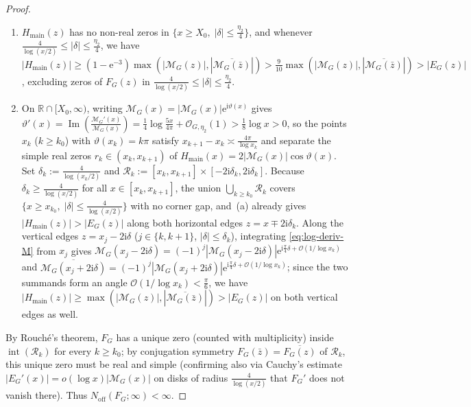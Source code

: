 \documentclass[11pt,a4paper,reqno]{amsart}
\theoremstyle{definition}
\theoremstyle{remark}
\numberwithin{equation}{section}
\newcommand{\R}{\mathbb{R}}
\newcommand{\ii}{\mathrm{i}}
\newcommand{\ee}{\mathrm{e}}
\DeclareMathOperator{\Imop}{Im}
\begin{document}
\begin{proof}
\begin{enumerate}[label=\textup{(\alph*)},leftmargin=1.8em]
  \item $H_{\mathrm{main}}(z)$ has no non-real zeros in $\{x \ge X_0,\; |\delta| \le \frac{\eta_2}{4}\}$, and whenever $\frac{4}{\log(x/2)} \le |\delta| \le \frac{\eta_2}{4}$, we have $|H_{\mathrm{main}}(z)| \ge (1 - \ee^{-3})\max(|\mathcal{M}_G(z)|, |\overline{\mathcal{M}_G(\bar{z})}|) > \frac{9}{10}\max(|\mathcal{M}_G(z)|, |\overline{\mathcal{M}_G(\bar{z})}|) > |E_G(z)|$, excluding zeros of $F_G(z)$ in $\frac{4}{\log(x/2)} \le |\delta| \le \frac{\eta_2}{4}$.
  \item On $\R \cap [X_0, \infty)$, writing $\mathcal{M}_G(x) = |\mathcal{M}_G(x)|\ee^{\ii\vartheta(x)}$ gives $\vartheta'(x) = \Imop(\frac{\mathcal{M}_G'(x)}{\mathcal{M}_G(x)}) = \frac{1}{4}\log\frac{5x}{4\pi} + \mathcal{O}_{G,\eta_2}(1) > \frac{1}{8}\log x > 0$, so the points $x_k$ ($k \ge k_0$) with $\vartheta(x_k) = k\pi$ satisfy $x_{k+1} - x_k \asymp \frac{4\pi}{\log x_k}$ and separate the simple real zeros $r_k \in (x_k, x_{k+1})$ of $H_{\mathrm{main}}(x) = 2|\mathcal{M}_G(x)|\cos\vartheta(x)$. Set $\delta_k := \frac{4}{\log(x_k/2)}$ and $\mathcal{R}_k := [x_k, x_{k+1}] \times [-2\ii\delta_k, 2\ii\delta_k]$. Because $\delta_k \ge \frac{4}{\log(x/2)}$ for all $x \in [x_k, x_{k+1}]$, the union $\bigcup_{k \ge k_0}\mathcal{R}_k$ covers $\{x \ge x_{k_0},\; |\delta| \le \frac{4}{\log(x/2)}\}$ with no corner gap, and~(a) already gives $|H_{\mathrm{main}}(z)| > |E_G(z)|$ along both horizontal edges $z = x \mp 2\ii\delta_k$. Along the vertical edges $z = x_j - 2\ii\delta$ ($j \in \{k, k+1\}$, $|\delta| \le \delta_k$), integrating \eqref{eq:log-deriv-M} from $x_j$ gives $\mathcal{M}_G(x_j - 2\ii\delta) = (-1)^j|\mathcal{M}_G(x_j - 2\ii\delta)|\ee^{\ii\frac{\pi}{4}\delta + \mathcal{O}(1/\log x_k)}$ and $\overline{\mathcal{M}_G(x_j + 2\ii\delta)} = (-1)^j|\mathcal{M}_G(x_j + 2\ii\delta)|\ee^{\ii\frac{\pi}{4}\delta + \mathcal{O}(1/\log x_k)}$; since the two summands form an angle $\mathcal{O}(1/\log x_k) < \frac{\pi}{6}$, we have $|H_{\mathrm{main}}(z)| \ge \max(|\mathcal{M}_G(z)|, |\overline{\mathcal{M}_G(\bar{z})}|) > |E_G(z)|$ on both vertical edges as well.
\end{enumerate}
By Rouch\'e's theorem, $F_G$ has a unique zero (counted with multiplicity) inside $\operatorname{int}(\mathcal{R}_k)$ for every $k \ge k_0$; by conjugation symmetry $F_G(\bar{z}) = \overline{F_G(z)}$ of $\mathcal{R}_k$, this unique zero must be real and simple (confirming also via Cauchy's estimate $|E_G'(x)| = o(\log x)|\mathcal{M}_G(x)|$ on disks of radius $\frac{4}{\log(x/2)}$ that $F_G'$ does not vanish there). Thus $N_{\mathrm{off}}(F_G; \infty) < \infty$.


\end{proof}
\end{document}
